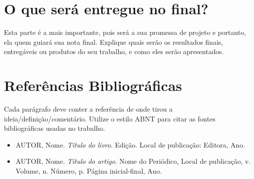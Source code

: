 \documentclass[a4paper,12pt]{article}
\begin{document}
\section{O que será entregue no final?}
Esta parte é a mais importante, pois será a sua promessa de projeto e portanto, ela quem guiará sua nota final.
Explique quais serão os resultados finais, entregáveis ou produtos do seu trabalho, e como eles serão apresentados.

\section{Referências Bibliográficas}
Cada parágrafo deve conter a referência de onde tirou a ideia/definição/comentário.
Utilize o estilo ABNT para citar as fontes bibliográficas usadas no trabalho.
\begin{itemize}
    \item AUTOR, Nome. \textit{Título do livro}. Edição. Local de publicação: Editora, Ano.
    \item AUTOR, Nome. \textit{Título do artigo}. Nome do Periódico, Local de publicação, v. Volume, n. Número, p. Página inicial-final, Ano.
\end{itemize}
\end{document}
